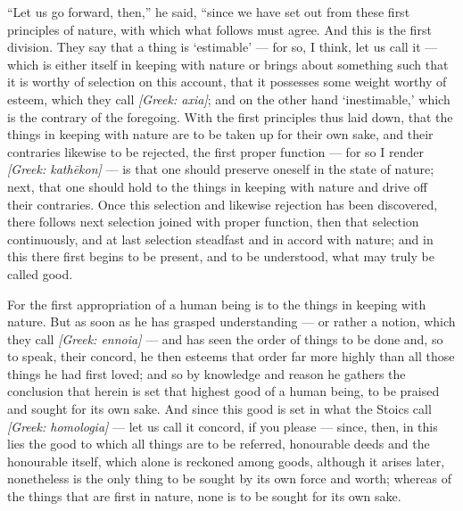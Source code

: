  ``Let us go forward, then,'' he said, ``since we have set out from these first principles of nature, with which what follows must agree. And this is the first division. They say that a thing is `estimable' — for so, I think, let us call it — which is either itself in keeping with nature or brings about something such that it is worthy of selection on this account, that it possesses some weight worthy of esteem, which they call \textit{[Greek: axia]}; and on the other hand `inestimable,' which is the contrary of the foregoing. With the first principles thus laid down, that the things in keeping with nature are to be taken up for their own sake, and their contraries likewise to be rejected, the first proper function — for so I render \textit{[Greek: kathēkon]} — is that one should preserve oneself in the state of nature; next, that one should hold to the things in keeping with nature and drive off their contraries. Once this selection and likewise rejection has been discovered, there follows next selection joined with proper function, then that selection continuously, and at last selection steadfast and in accord with nature; and in this there first begins to be present, and to be understood, what may truly be called good.

 For the first appropriation of a human being is to the things in keeping with nature. But as soon as he has grasped understanding — or rather a notion, which they call \textit{[Greek: ennoia]} — and has seen the order of things to be done and, so to speak, their concord, he then esteems that order far more highly than all those things he had first loved; and so by knowledge and reason he gathers the conclusion that herein is set that highest good of a human being, to be praised and sought for its own sake. And since this good is set in what the Stoics call \textit{[Greek: homologia]} — let us call it concord, if you please — since, then, in this lies the good to which all things are to be referred, honourable deeds and the honourable itself, which alone is reckoned among goods, although it arises later, nonetheless is the only thing to be sought by its own force and worth; whereas of the things that are first in nature, none is to be sought for its own sake.

